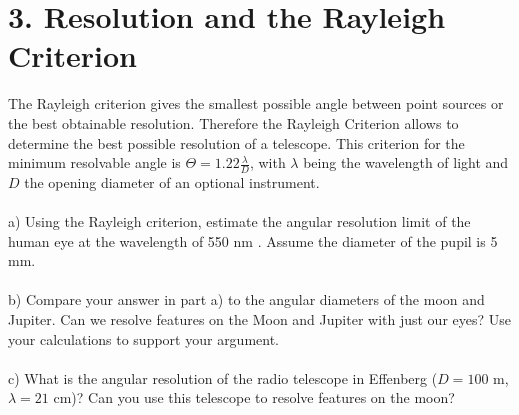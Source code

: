 \section*{3. Resolution and the Rayleigh Criterion}

The Rayleigh criterion gives the smallest possible angle between point sources or the best obtainable
resolution. Therefore the Rayleigh Criterion allows to determine the best possible resolution of a 
telescope. This criterion for the minimum resolvable angle is $\Theta = 1.22 \frac{\lambda}{D}$, with 
$\lambda$ being the wavelength of light and $D$ the opening diameter of an optional instrument.\\
\\
a) Using the Rayleigh criterion, estimate the angular resolution limit of the human eye at the wavelength
of 550 nm . Assume the diameter of the pupil is 5 mm.\\
\\
b) Compare your answer in part a) to the angular diameters of the moon and Jupiter. Can we resolve 
features on the Moon and Jupiter with just our eyes? Use your calculations to support your argument.\\
\\
c) What is the angular resolution of the radio telescope in Effenberg ($D = 100$ m, $\lambda = 21$ cm)?
Can you use this telescope to resolve features on the moon?\\
\\
